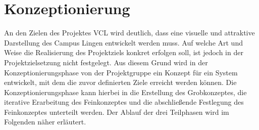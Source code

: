 \section{Konzeptionierung}
\label{sec:Konzeptionierung}

An den Zielen des Projektes \acs{VCL} wird deutlich, dass eine visuelle und
attraktive Darstellung des Campus Lingen entwickelt werden muss. Auf welche Art
und Weise die Realisierung des Projektziels konkret erfolgen soll, ist jedoch in
der Projektzielsetzung nicht festgelegt. Aus diesem Grund wird in der
Konzeptionierungsphase von der Projektgruppe ein Konzept für ein System
entwickelt, mit dem die zuvor definierten Ziele erreicht werden können. Die
Konzeptionierungsphase kann hierbei in die Erstellung des Grobkonzeptes, die
iterative Erarbeitung des Feinkonzeptes und die abschließende Festlegung des
Feinkonzeptes unterteilt werden. Der Ablauf der drei Teilphasen wird im
Folgenden näher erläutert.


\clearpage



\clearpage

